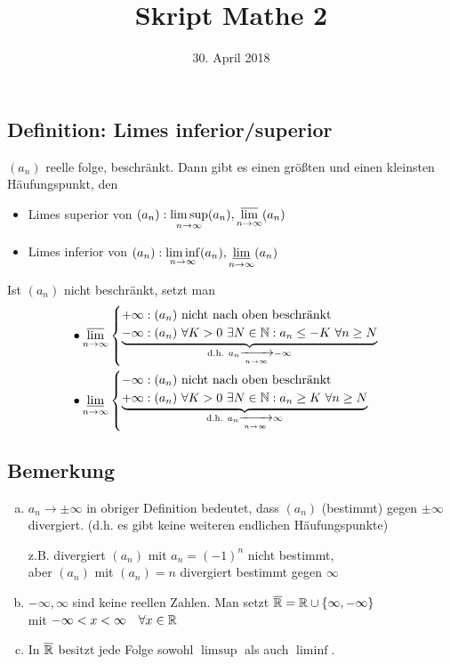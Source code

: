 \documentclass[10pt, a4paper, fleqn]{article}
\begin{document}
    \title{Skript Mathe 2}
    \date{30. April 2018}
    \maketitle
\fi
    \subsection{Definition: Limes inferior/superior}
    $(a_n)$ reelle folge, beschränkt. Dann gibt es einen größten
    und einen kleinsten Häufungspunkt, den
    \begin{itemize}
        \item Limes superior von $(a_n): \limsup\limits_{n\to\infty} (a_n), \varlimsup\limits_{n \to \infty}(a_n)$
        \item Limes inferior von $(a_n): \liminf\limits_{n\to\infty} (a_n), \varliminf\limits_{n \to \infty}(a_n)$
    \end{itemize}
    Ist $(a_n)$ nicht beschränkt, setzt man
    $$\begin{aligned}
        & \bullet \varlimsup_{n \to \infty}
        \begin{cases}
            +\infty : (a_n) \text{ nicht nach oben beschränkt} \\
            \underbrace{-\infty : (a_n) \ \forall K > 0 \ \exists N \in \mathbb{N} : a_n \leq -K \ \forall n \geq N}_{\text{d.h. } a_n \xrightarrow[n \to \infty]{}-\infty}
        \end{cases} \\
        & \bullet \varliminf_{n \to \infty}
        \begin{cases}
            -\infty : (a_n) \text{ nicht nach oben beschränkt} \\
            \underbrace{+\infty : (a_n) \ \forall K > 0 \ \exists N \in \mathbb{N} : a_n \geq K \ \forall n \geq N}_{\text{d.h. } a_n \xrightarrow[n \to \infty]{}\infty}
        \end{cases}
    \end{aligned}$$

    \subsection{Bemerkung}
    \begin{enumerate}[a)]
        \item $a_n \to \pm\infty$ in obriger Definition bedeutet, dass $(a_n)$ (bestimmt)
        gegen $\pm \infty$ divergiert. (d.h. es gibt keine weiteren endlichen Häufungspunkte)

        z.B. divergiert $(a_n)$ mit $a_n = (-1)^n$ nicht bestimmt, \\
        aber $(a_n)$ mit $(a_n) = n$ divergiert bestimmt gegen $\infty$

        \item $-\infty, \infty$ sind keine reellen Zahlen. 
        Man setzt $\overline{\mathbb{R}} = \mathbb{R} \cup \{\infty, -\infty\}$ \\ 
        mit $-\infty < x < \infty \quad \forall x \in \mathbb{R}$

        \item In $\overline{\mathbb{R}}$ besitzt jede Folge sowohl $\limsup$ als auch $\liminf$.
    \end{enumerate}
\end{document}
